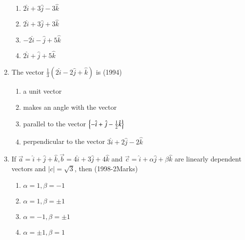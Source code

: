 \documentclass[journal,12pt,twocolumn]{IEEEtran}
\theoremstyle{remark}
\begin{document}
\begin{enumerate}
		\begin{enumerate}
			\item $2\hat{i}+3\hat{j}-3\hat{k}$
			\item $2\hat{i}+3\hat{j}+3\hat{k}$
			\item $-2\hat{i}-\hat{j}+5\hat{k}$
			\item $2\hat{i}+\hat{j}+5\hat{k}$
		\end{enumerate}
\item %
	The vector $\frac{1}{3}(2\hat{i}-2\hat{j}+\hat{k})$ is \hfill{(1994)}\\
		\begin{enumerate}
			\item a unit vector
			\item makes an angle with the vector
			\item parallel to the vector $\left\{-\hat{i}+\hat{j}-\frac{1}{2}\hat{k}\right\}$
			\item perpendicular to the vector $3\hat{i}+2\hat{j}-2\hat{k}$
                \end{enumerate}
\item %
	If $\overrightarrow{a}=\hat{i}+\hat{j}+\hat{k}$,$\overrightarrow{b}=4\hat{i}+3\hat{j}+4\hat{k}$ and $\overrightarrow{c}=\hat{i}+\alpha\hat{j}+\beta\hat{k}$ are linearly dependent vectors and $|c|=\sqrt{3}$, then \hfill{(1998-2Marks)}\\
		\begin{enumerate}
			\item $\alpha=1,\beta=-1$
			\item $\alpha=1,\beta=\pm1$
			\item $\alpha=-1,\beta=\pm1$
			\item $\alpha=\pm1,\beta=1$
		\end{enumerate}
\end{enumerate}
\end{document}
